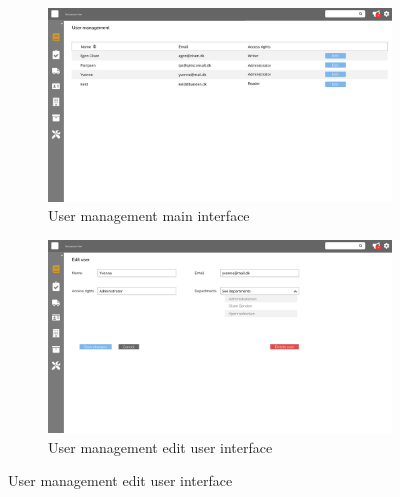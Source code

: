 \begin{figure}[H]
	\centering
	\begin{subfigure}[b]{0.48\textwidth}
		\includegraphics[width=\textwidth]{billeder/iteration3Prototyper/Page_20.jpg}
		\caption{User management main interface}
		\label{fig:5-UserMan}
	\end{subfigure}
	\quad
	\begin{subfigure}[b]{0.48\textwidth}
		\includegraphics[width=\textwidth]{billeder/iteration3Prototyper/Page_21.jpg}
		\caption{User management edit user interface}
		\label{fig:5-UserManEdit}
	\end{subfigure}
\end{figure}

